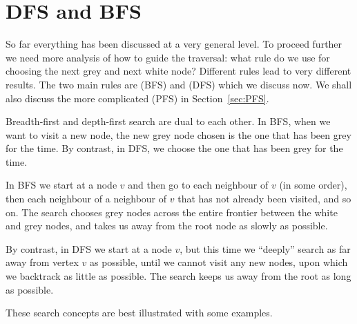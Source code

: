 \section{DFS and BFS}
\label{sec:BFSDFS}

So far everything has been discussed at a very general level. To proceed
further we need more analysis of how to guide the traversal: what rule do
we use for choosing the next grey and next white node? Different rules lead
to very different results. The two main rules are  (BFS) and  (DFS) which we discuss now.
We shall also discuss the more complicated  (PFS) in Section~\ref{sec:PFS}.

Breadth-first and depth-first search are dual to each other.  In BFS,
when we want to visit a new node, the new grey node chosen is the one
that has been grey for the  time. By contrast, in DFS,
we choose the one that has been grey for the  time.

In BFS we start at a node $v$ and then go to each neighbour of $v$ (in
some order), then each neighbour of a neighbour of $v$ that has not
already been visited, and so on. The search chooses grey nodes across
the entire  frontier between the white and grey nodes, and takes us away
from the root node as slowly as possible.

By contrast, in  DFS we start at a node $v$, but this time we ``deeply''
search as far away from vertex $v$ as possible, until we cannot visit
any new nodes, upon which we backtrack as little as possible. The search
keeps us away from the root as long as possible.

These search concepts are best illustrated with some examples.


